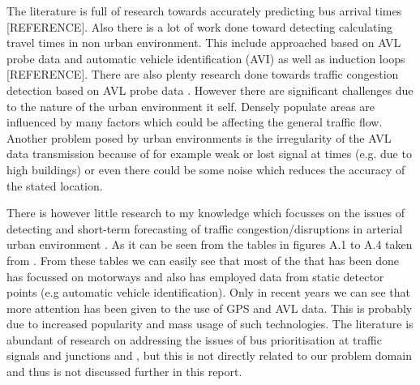 The literature is full of research towards accurately predicting bus arrival times [REFERENCE]. Also there is a lot of work done toward detecting calculating travel times in non urban environment. This include approached based on AVL probe data and automatic vehicle identification (AVI) as well as induction loops [REFERENCE]. There are also plenty research done towards traffic congestion detection based on AVL probe data \cite{Vlahogianni20143}. However there are significant challenges due to the nature of the urban environment it self. Densely populate areas are influenced by many factors which could be affecting the general traffic flow. Another problem posed by urban environments is the irregularity of the AVL data transmission because of for example weak or lost signal at times (e.g. due to high buildings) or even there could be some noise which reduces the accuracy of the stated location. 

There is however little research to my knowledge which focusses on the issues of detecting and short-term forecasting of traffic congestion/disruptions in arterial urban environment  \cite{Vlahogianni20143} \cite{5625144}. As it can be seen from the tables in figures A.1 to A.4 taken from \cite{Vlahogianni20143}. From these tables we can easily see that most of the that has been done has focussed on motorways and also has employed data from static detector points (e.g automatic vehicle identification). Only in recent years we can see that more attention has been given to the use of GPS and AVL data. This is probably due to increased popularity and mass usage of such technologies. The literature is abundant of research on addressing the issues of bus prioritisation at traffic signals and junctions \cite{eps52676} and \cite{clarke2007}, but this is not directly related to our problem domain and thus is not discussed further in this report.


